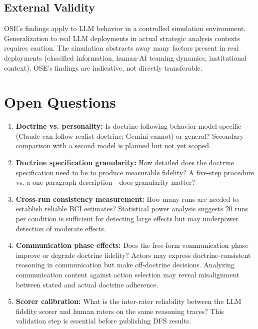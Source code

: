 \documentclass[12pt, a4paper]{article}
\begin{document}
\subsection{External Validity}

OSE's findings apply to LLM behavior in a controlled simulation environment. Generalization to real LLM deployments in actual strategic analysis contexts requires caution. The simulation abstracts away many factors present in real deployments (classified information, human-AI teaming dynamics, institutional context). OSE's findings are indicative, not directly transferable.

\section{Open Questions}

\begin{enumerate}[leftmargin=1.5em]
    \item \textbf{Doctrine vs. personality:} Is doctrine-following behavior model-specific (Claude can follow realist doctrine; Gemini cannot) or general? Secondary comparison with a second model is planned but not yet scoped.

    \item \textbf{Doctrine specification granularity:} How detailed does the doctrine specification need to be to produce measurable fidelity? A five-step procedure vs. a one-paragraph description---does granularity matter?

    \item \textbf{Cross-run consistency measurement:} How many runs are needed to establish reliable BCI estimates? Statistical power analysis suggests 20 runs per condition is sufficient for detecting large effects but may underpower detection of moderate effects.

    \item \textbf{Communication phase effects:} Does the free-form communication phase improve or degrade doctrine fidelity? Actors may express doctrine-consistent reasoning in communication but make off-doctrine decisions. Analyzing communication content against action selection may reveal misalignment between stated and actual doctrine adherence.

    \item \textbf{Scorer calibration:} What is the inter-rater reliability between the LLM fidelity scorer and human raters on the same reasoning traces? This validation step is essential before publishing DFS results.
\end{enumerate}
\end{document}
